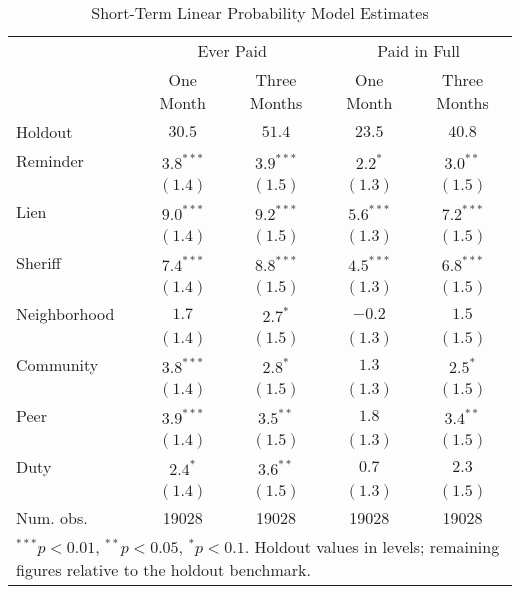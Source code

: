 \documentclass[12pt]{article}
\begin{document}
\begin{table}[htb]
\centering
\caption{Short-Term Linear Probability Model Estimates} \label{sh_lin}
\bigskip
\begin{tabular}{l c c c c }
\hline
 & \multicolumn{2}{c}{Ever Paid} & \multicolumn{2}{c}{Paid in Full} \\
          & One Month & Three Months & One Month & Three Months \\
Holdout   & $30.5$ & $51.4$ & $23.5$ & $40.8$ \\
\hline
Reminder   & $3.8^{***}$  & $3.9^{***}$  & $2.2^{*}$    & $3.0^{**}$   \\
          & $(1.4)$      & $(1.5)$      & $(1.3)$      & $(1.5)$      \\
Lien      & $9.0^{***}$  & $9.2^{***}$  & $5.6^{***}$  & $7.2^{***}$  \\
          & $(1.4)$      & $(1.5)$      & $(1.3)$      & $(1.5)$      \\
Sheriff   & $7.4^{***}$  & $8.8^{***}$  & $4.5^{***}$  & $6.8^{***}$  \\
          & $(1.4)$      & $(1.5)$      & $(1.3)$      & $(1.5)$      \\
Neighborhood & $1.7$        & $2.7^{*}$    & $-0.2$       & $1.5$        \\
          & $(1.4)$      & $(1.5)$      & $(1.3)$      & $(1.5)$      \\
Community     & $3.8^{***}$  & $2.8^{*}$    & $1.3$        & $2.5^{*}$    \\
          & $(1.4)$      & $(1.5)$      & $(1.3)$      & $(1.5)$      \\
Peer      & $3.9^{***}$  & $3.5^{**}$   & $1.8$        & $3.4^{**}$   \\
          & $(1.4)$      & $(1.5)$      & $(1.3)$      & $(1.5)$      \\          
Duty      & $2.4^{*}$    & $3.6^{**}$   & $0.7$        & $2.3$        \\
          & $(1.4)$      & $(1.5)$      & $(1.3)$      & $(1.5)$      \\
\hline
Num. obs. & 19028        & 19028        & 19028        & 19028        \\
\hline
\multicolumn{5}{l}{\scriptsize{$^{***}p<0.01$, $^{**}p<0.05$,
    $^*p<0.1$. Holdout values in levels; remaining figures relative to
    the holdout benchmark.}}
\end{tabular}
\end{table}
\end{document}
